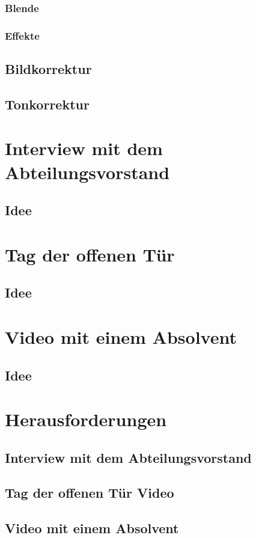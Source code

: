 \subsubsection{Blende}
\subsubsection{Effekte}
\subsection{Bildkorrektur}
\subsection{Tonkorrektur}

\section{Interview mit dem Abteilungsvorstand}
\subsection{Idee}
 
\section{Tag der offenen Tür}
\subsection{Idee}

\section{Video mit einem Absolvent}
\subsection{Idee}

\section{Herausforderungen}
\subsection{Interview mit dem Abteilungsvorstand}
\subsection{Tag der offenen Tür Video}
\subsection{Video mit einem Absolvent}


